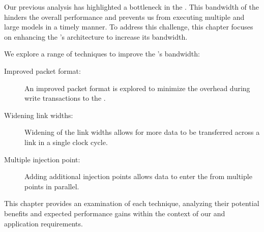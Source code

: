

Our previous analysis has highlighted a bottleneck in the \confignoc{}.
This bandwidth of the \confignoc{} hinders the overall performance and prevents us from executing multiple and large models in a timely manner.
To address this challenge, this chapter focuses on enhancing the \confignoc{}'s architecture to increase its bandwidth.

We explore a range of techniques to improve the \confignoc{}'s bandwidth:
\begin{description}
    \item[Improved packet format:]
    An improved packet format is explored to minimize the overhead during write transactions to the \graicore{}.
    \item[Widening link widths:]
    Widening of the link widths allows for more data to be transferred across a link in a single clock cycle.
    \item[Multiple injection point:]
    Adding additional injection points allows data to enter the \confignoc{} from multiple points in parallel.
\end{description}

This chapter provides an examination of each technique, analyzing their potential benefits and expected performance gains within the context of our \confignoc{} and application requirements.
